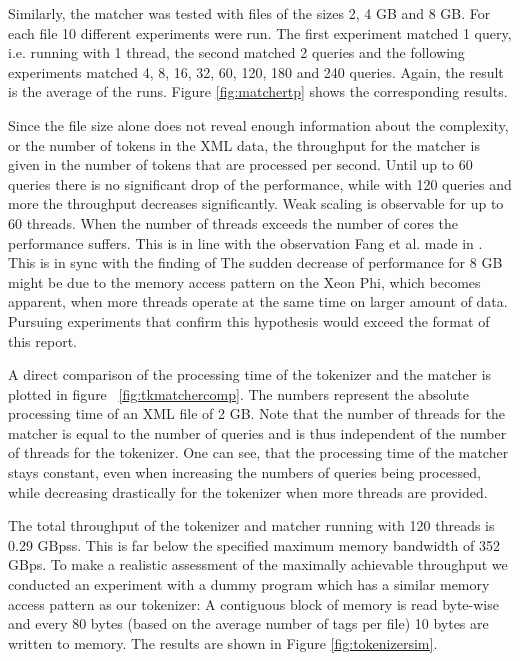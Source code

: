 Similarly, the matcher was tested with files of the sizes 2, 4 GB and 8 GB. For
each file 10 different experiments were run. The first experiment matched 1
query, i.e. running with 1 thread, the second matched 2 queries and the
following experiments matched 4, 8, 16, 32, 60, 120, 180 and 240 queries.
Again, the result is the average of the runs. Figure \ref{fig:matchertp}
shows the corresponding results.

Since the file size alone does not reveal enough information about the
complexity, or the number of tokens in the XML data, the throughput for the
matcher is given in the number of tokens that are processed per second. Until up
to 60 queries there is no significant drop of the performance, while with 120
queries and more the throughput decreases significantly. Weak scaling is
observable for up to 60 threads. When the number of threads exceeds the number
of cores the performance suffers. This is in line with the observation Fang et
al. made in \cite{Fang14}. This is in sync with the finding of  The sudden
decrease of performance for 8 GB might be due to the memory access pattern on
the Xeon Phi, which becomes apparent, when more threads operate at the same time
on larger amount of data.  Pursuing experiments that confirm this hypothesis
would exceed the format of this report. 

A direct comparison of the processing time of the tokenizer and the matcher is
plotted in figure ~\ref{fig:tkmatchercomp}. The numbers represent the absolute
processing time of an XML file of 2 GB. Note that the number of threads for the
matcher is equal to the number of queries and is thus independent of the number
of threads for the tokenizer. One can see, that the processing time of the
matcher stays constant, even when increasing the numbers of queries being
processed, while decreasing drastically for the tokenizer when more threads are
provided.

The total throughput of the tokenizer and matcher running with 120 threads is
0.29 GBpss. This is far below the specified maximum memory bandwidth of 352
GBps. To make a realistic assessment of the maximally achievable throughput
we conducted an experiment with a dummy program which has a similar memory
access pattern as our tokenizer: A contiguous block of memory is read byte-wise
and every 80 bytes (based on the average number of tags per file) 10 bytes are
written to memory. The results are shown in Figure \ref{fig:tokenizersim}.
